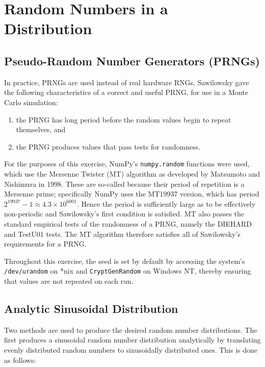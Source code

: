 \section{Random Numbers in a Distribution}
\label{sec:random}

\subsection{Pseudo-Random Number Generators (PRNGs)}
\label{subsec:prngs}

In practice, PRNGs are used instead of real hardware RNGs. Sawilowsky gave the following characteristics of a correct and useful PRNG, for use in a Monte Carlo simulation\cite{Sawilowsky03}:
\begin{enumerate}
    \item
        the PRNG has long period before the random values begin to repeat themselves, and
    \item
        the PRNG produces values that pass tests for randomness.
\end{enumerate}

For the purposes of this exercise, NumPy's \texttt{numpy.random} functions were used, which use the Mersenne Twister (MT) algorithm as developed by Matsumoto and Nishimura in 1998\cite{Matsumoto98}. These are so-called because their period of repetition is a Mersenne prime; specifically NumPy uses the MT19937 version\cite{PythonRandom}, which has period $2^{19937} - 1 \approx 4.3 \times 10^{6001}$\cite{Matsumoto98}. Hence the period is sufficiently large as to be effectively non-periodic and Sawilowsky's first condition is satisfied. MT also passes the standard empirical tests of the randomness of a PRNG, namely the DIEHARD and TestU01 tests\cite{Ecuyer08,Jagannatam09}. The MT algorithm therefore satisfies all of Sawilowsky's requirements for a PRNG.


Throughout this exercise, the seed is set by default by accessing the system's \texttt{/dev/urandom} on *nix and \texttt{CryptGenRandom} on Windows NT, thereby ensuring that values are not repeated on each run.

\subsection{Analytic Sinusoidal Distribution}
\label{subsec:analytic_sin}

Two methods are used to produce the desired random number distributions. The first produces a sinusoidal random number distribution analytically by translating evenly distributed random numbers to sinusoidally distributed ones. This is done as follows:

